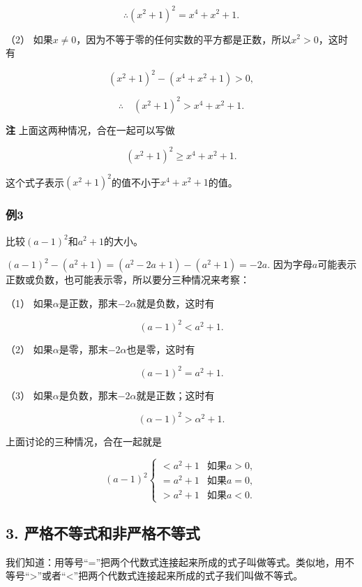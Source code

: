 \[
\therefore (x^{2} + 1)^{2} = x^{4} + x^{2} + 1.
\]

（2）
如果\(x \neq 0\)，因为不等于零的任何实数的平方都是正数，所以\(x^2 > 0\)，这时有

\[
(x^{2} + 1)^{2} - (x^{4} + x^{2} + 1) > 0,
\]

\[
\therefore \quad (x^{2} + 1)^{2} > x^{4} + x^{2} + 1.
\]

\textbf{注} 上面这两种情况，合在一起可以写做

\[
(x^{2} + 1)^{2} \geqslant x^{4} + x^{2} + 1.
\]

这个式子表示\((x^{2} + 1)^{2}\)的值不小于\(x^{4} + x^{2} + 1\)的值。

\subsubsection{例3}

比较\((a - 1)^2\)和\(a^2 + 1\)的大小。

\((a - 1)^{2} - (a^{2} + 1) = (a^{2} - 2a + 1) - (a^{2} + 1) = -2a.\)
因为字母\(a\)可能表示正数或负数，也可能表示零，所以要分三种情况来考察：

（1） 如果\(\alpha\)是正数，那末\(-2\alpha\)就是负数，这时有

\[
(a-1)^2 < a^2+1.
\]

（2） 如果\(\alpha\)是零，那末\(-2\alpha\)也是零，这时有

\[
(a - 1)^{2} = a^{2} + 1.
\]

（3） 如果\(\alpha\)是负数，那末\(-2\alpha\)就是正数；这时有

\[
(\alpha - 1)^{2} > \alpha^{2} + 1.
\]

上面讨论的三种情况，合在一起就是

\[
(a-1)^{2} \left\{ \begin{array}{ll} < a^{2} + 1 & \text{如果} a > 0, \\ = a^{2} + 1 & \text{如果} a = 0, \\ > a^{2} + 1 & \text{如果} a < 0. \end{array} \right.
\]

\subsection{3. 严格不等式和非严格不等式}

我们知道：用等号``=''把两个代数式连接起来所成的式子叫做等式。类似地，用不等号``\textgreater''或者``\textless''把两个代数式连接起来所成的式子我们叫做不等式。

